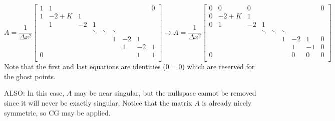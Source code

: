 \documentclass[landscape]{article}
\begin{document}
\[ A = \frac{1}{\Delta x^2} \left[\begin{array}{ccccccccc}
1  & 1     &           &           &           &           &           &         &  0 \\
1  & -2+K  & 1         &           &           &           &           &         &    \\
   & 1     & -2        & 1         &           &           &           &         &    \\
   &       &           & \ddots    & \ddots    & \ddots    &           &         &    \\
   &       &           &           &           & 1         & -2        & 1       &    \\
   &       &           &           &           &           &  1        & -2      &  1 \\
0  &       &           &           &           &           &           & 1       &  1 \\
\end{array} \right]
\rightarrow
A = \frac{1}{\Delta x^2} \left[\begin{array}{ccccccccc}
0  & 0     & 0         &           &           &           &           &         &  0 \\
0  & -2+K  & 1         &           &           &           &           &         &    \\
0  & 1     & -2        & 1         &           &           &           &         &    \\
   &       &           & \ddots    & \ddots    & \ddots    &           &         &    \\
   &       &           &           &           & 1         & -2        & 1       &  0 \\
   &       &           &           &           &           &  1        & -1      &  0 \\
0  &       &           &           &           &           &  0        & 0       &  0 \\
\end{array} \right]
\]
Note that the first and last equations are identities ($0=0$) which are reserved for the ghost points.

ALSO: In this case, $A$ may be near singular, but the nullspace cannot be removed since it will never be exactly singular. Notice that the matrix $A$ is already nicely symmetric, so CG may be applied.
\end{document}
